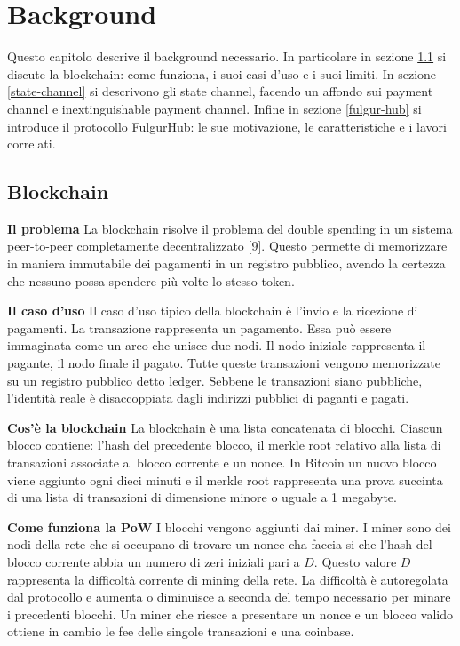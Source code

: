 \documentclass[12pt,italian,]{book}
\begin{document}
\hypertarget{background}{%
\chapter{Background}\label{background}}

Questo capitolo descrive il background necessario. In particolare in sezione \ref{blockchain} si discute la blockchain: come funziona, i suoi casi d'uso e i suoi limiti. In sezione \ref{state-channel} si descrivono gli state channel, facendo un affondo sui payment channel e inextinguishable payment channel. Infine in sezione \ref{fulgur-hub} si introduce il protocollo FulgurHub: le sue motivazione, le caratteristiche e i lavori correlati.

\hypertarget{blockchain}{%
\section{Blockchain}\label{blockchain}}

\textbf{\textbf{Il problema}} La blockchain risolve il problema del double spending in un sistema peer-to-peer completamente decentralizzato {[}9{]}. Questo permette di memorizzare in maniera immutabile dei pagamenti in un registro pubblico, avendo la certezza che nessuno possa spendere più volte lo stesso token.

\textbf{\textbf{Il caso d'uso}} Il caso d'uso tipico della blockchain è l'invio e la ricezione di pagamenti. La transazione rappresenta un pagamento. Essa può essere immaginata come un arco che unisce due nodi. Il nodo iniziale rappresenta il pagante, il nodo finale il pagato. Tutte queste transazioni vengono memorizzate su un registro pubblico detto ledger. Sebbene le transazioni siano pubbliche, l'identità reale è disaccoppiata dagli indirizzi pubblici di paganti e pagati.

\textbf{\textbf{Cos'è la blockchain}} La blockchain è una lista concatenata di blocchi. Ciascun blocco contiene: l'hash del precedente blocco, il merkle root relativo alla lista di transazioni associate al blocco corrente e un nonce. In Bitcoin un nuovo blocco viene aggiunto ogni dieci minuti e il merkle root rappresenta una prova succinta di una lista di transazioni di dimensione minore o uguale a 1 megabyte.

\textbf{\textbf{Come funziona la PoW}} I blocchi vengono aggiunti dai miner. I miner sono dei nodi della rete che si occupano di trovare un nonce cha faccia si che l'hash del blocco corrente abbia un numero di zeri iniziali pari a \(D\). Questo valore \(D\) rappresenta la difficoltà corrente di mining della rete. La difficoltà è autoregolata dal protocollo e aumenta o diminuisce a seconda del tempo necessario per minare i precedenti blocchi. Un miner che riesce a presentare un nonce e un blocco valido ottiene in cambio le fee delle singole transazioni e una coinbase.
\end{document}
